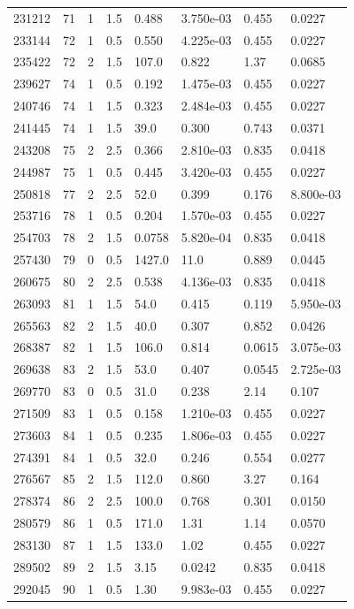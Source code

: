 \documentclass[preview]{standalone}
\begin{document}
{{{{\begin{tabular}{L{1.2cm}C{1.2cm} C{0.3cm}C{0.5cm} C{1.4cm}C{1.4cm} C{1.4cm}C{1.4cm}}
  231212  &    71  & 1     & 1.5 &  0.488  & 3.750e-03  & 0.455 &  0.0227   \\ 
  233144  &    72  & 1     & 0.5 &  0.550  & 4.225e-03  & 0.455 &  0.0227   \\ 
  235422  &    72  & 2     & 1.5 &  107.0  & 0.822  & 1.37 &  0.0685   \\ 
  239627  &    74  & 1     & 0.5 &  0.192  & 1.475e-03  & 0.455 &  0.0227   \\ 
  240746  &    74  & 1     & 1.5 &  0.323  & 2.484e-03  & 0.455 &  0.0227   \\ 
  241445  &    74  & 1     & 1.5 &  39.0  & 0.300  & 0.743 &  0.0371   \\ 
  243208  &    75  & 2     & 2.5 &  0.366  & 2.810e-03  & 0.835 &  0.0418   \\ 
  244987  &    75  & 1     & 0.5 &  0.445  & 3.420e-03  & 0.455 &  0.0227   \\ 
  250818  &    77  & 2     & 2.5 &  52.0  & 0.399  & 0.176 &  8.800e-03   \\ 
  253716  &    78  & 1     & 0.5 &  0.204  & 1.570e-03  & 0.455 &  0.0227   \\ 
  254703  &    78  & 2     & 1.5 &  0.0758  & 5.820e-04  & 0.835 &  0.0418   \\ 
  257430  &    79  & 0     & 0.5 &  1427.0  & 11.0  & 0.889 &  0.0445   \\ 
  260675  &    80  & 2     & 2.5 &  0.538  & 4.136e-03  & 0.835 &  0.0418   \\ 
  263093  &    81  & 1     & 1.5 &  54.0  & 0.415  & 0.119 &  5.950e-03   \\ 
  265563  &    82  & 2     & 1.5 &  40.0  & 0.307  & 0.852 &  0.0426   \\ 
  268387  &    82  & 1     & 1.5 &  106.0  & 0.814  & 0.0615 &  3.075e-03   \\ 
  269638  &    83  & 2     & 1.5 &  53.0  & 0.407  & 0.0545 &  2.725e-03   \\ 
  269770  &    83  & 0     & 0.5 &  31.0  & 0.238  & 2.14 &  0.107   \\ 
  271509  &    83  & 1     & 0.5 &  0.158  & 1.210e-03  & 0.455 &  0.0227   \\ 
  273603  &    84  & 1     & 0.5 &  0.235  & 1.806e-03  & 0.455 &  0.0227   \\ 
  274391  &    84  & 1     & 0.5 &  32.0  & 0.246  & 0.554 &  0.0277   \\ 
  276567  &    85  & 2     & 1.5 &  112.0  & 0.860  & 3.27 &  0.164   \\ 
  278374  &    86  & 2     & 2.5 &  100.0  & 0.768  & 0.301 &  0.0150   \\ 
  280579  &    86  & 1     & 0.5 &  171.0  & 1.31  & 1.14 &  0.0570   \\ 
  283130  &    87  & 1     & 1.5 &  133.0  & 1.02  & 0.455 &  0.0227   \\ 
  289502  &    89  & 2     & 1.5 &  3.15  & 0.0242  & 0.835 &  0.0418   \\ 
  292045  &    90  & 1     & 0.5 &  1.30  & 9.983e-03  & 0.455 &  0.0227   \\ 
\hline 
\end{tabular} 

}}}}
\end{document}
